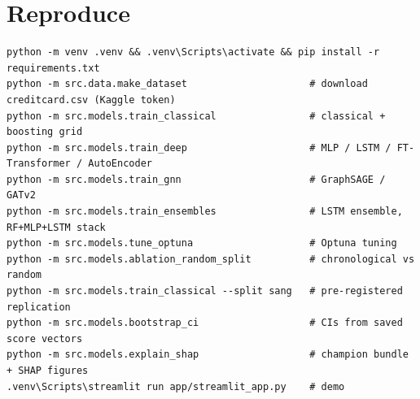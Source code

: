 \documentclass[11pt,a4paper]{article}
\begin{document}
\appendix
\section{Reproduce}
\begin{lstlisting}
python -m venv .venv && .venv\Scripts\activate && pip install -r requirements.txt
python -m src.data.make_dataset                     # download creditcard.csv (Kaggle token)
python -m src.models.train_classical                # classical + boosting grid
python -m src.models.train_deep                     # MLP / LSTM / FT-Transformer / AutoEncoder
python -m src.models.train_gnn                      # GraphSAGE / GATv2
python -m src.models.train_ensembles                # LSTM ensemble, RF+MLP+LSTM stack
python -m src.models.tune_optuna                    # Optuna tuning
python -m src.models.ablation_random_split          # chronological vs random
python -m src.models.train_classical --split sang   # pre-registered replication
python -m src.models.bootstrap_ci                   # CIs from saved score vectors
python -m src.models.explain_shap                   # champion bundle + SHAP figures
.venv\Scripts\streamlit run app/streamlit_app.py    # demo
\end{lstlisting}
\end{document}
